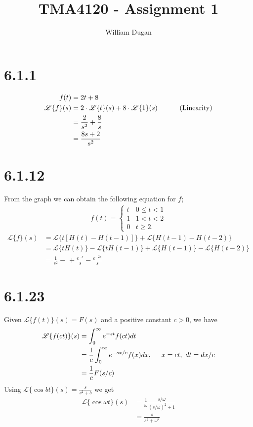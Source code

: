 \documentclass[11pt,a4paper]{article}
\newcommand{\Laplace}{\mathscr{L}}
\begin{document}
\title{TMA4120 - Assignment 1} 
\author{William Dugan}

\maketitle

\section*{6.1.1}
\begin{align*}
	f(t) &= 2t + 8 \\
	\Laplace\{f\}(s) &= 2 \cdot \Laplace\{t\}(s) + 8 \cdot \Laplace\{1\}(s) 
		\hspace*{1cm} \text{ (Linearity)} \\
	&= \frac{2}{s^2} + \frac{8}{s} \\
	&= \frac{8s + 2}{s^2}
\end{align*}

\section*{6.1.12}
From the graph we can obtain the following equation for $f$;
\begin{align*}
	f(t) = 
	\left\{\begin{matrix}
	t & 0 \leq t < 1 \\ 
	1 & 1 < t < 2 \\ 
	0 & t \ge 2.
	\end{matrix}\right.
\end{align*}
\begin{align*}
	\Laplace\{f\}(s) 
	&= \Laplace\{t [H(t) - H(t-1)]\} + \Laplace\{H(t-1) - H(t-2)\} \\
	&= \Laplace\{tH(t)\} - \Laplace\{tH(t-1)\} + \Laplace\{H(t-1)\} - \Laplace\{H(t-2)\} \\
	&= \frac{1}{s^2} - \frac{}{} + \frac{e^{-s}}{s} - \frac{e^{-2s}}{s}
\end{align*}

\section*{6.1.23}
Given $\Laplace\{f(t)\}(s) = F(s)$ and a positive constant $c > 0$, we have
\begin{align*}
	\Laplace\{f(ct)\}(s)
	&= \int_0^{\infty} e^{-st}f(ct)dt \\
	&= \frac{1}{c} \int_0^{\infty} e^{-sx/c}f(x)dx, \hspace*{.5cm} x=ct,\ dt = dx/c\\
	&= \frac{1}{c} F(s/c)
\end{align*}
Using $\Laplace\{\cos bt\}(s) = \frac{s}{s^2 + b}$ we get
\begin{align*}
	\Laplace\{\cos\omega t\}(s) 
	&= \frac{1}{\omega} \frac{s/\omega}{(s/\omega)^2 + 1} \\
	&= \frac{s}{s^2 + \omega^2}
\end{align*}
\end{document}

